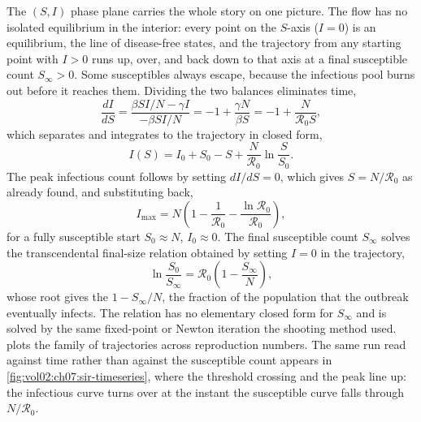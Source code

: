 The $(S, I)$ phase plane carries the whole story on one picture. The
flow has no isolated equilibrium in the interior: every point on the
$S$-axis ($I = 0$) is an equilibrium, the line of disease-free states,
and the trajectory from any starting point with $I > 0$ runs up, over,
and back down to that axis at a final susceptible count $S_{\infty} >
0$. Some susceptibles always escape, because the infectious pool burns
out before it reaches them. Dividing the two balances eliminates time,
\[
\frac{dI}{dS} = \frac{\beta S I/N - \gamma I}{-\beta S I/N}
= -1 + \frac{\gamma N}{\beta S} = -1 + \frac{N}{\mathcal{R}_{0} S},
\]
which separates and integrates to the trajectory in closed form,
\[
I(S) = I_{0} + S_{0} - S + \frac{N}{\mathcal{R}_{0}}
\ln\!\frac{S}{S_{0}}.
\]
The peak infectious count follows by setting $dI/dS = 0$, which gives
$S = N/\mathcal{R}_{0}$ as already found, and substituting back,
\[
I_{\max} = N\left(1 - \frac{1}{\mathcal{R}_{0}}
- \frac{\ln \mathcal{R}_{0}}{\mathcal{R}_{0}}\right),
\]
for a fully susceptible start $S_{0} \approx N$, $I_{0} \approx 0$.
The final susceptible count $S_{\infty}$ solves the transcendental
final-size relation obtained by setting $I = 0$ in the trajectory,
\[
\ln\!\frac{S_{0}}{S_{\infty}} = \mathcal{R}_{0}
\left(1 - \frac{S_{\infty}}{N}\right),
\]
whose root gives the  $1 - S_{\infty}/N$, the
fraction of the population that the outbreak eventually infects. The
relation has no elementary closed form for $S_{\infty}$ and is solved
by the same fixed-point or Newton iteration the shooting method used.
 plots the family of trajectories
across reproduction numbers. The same run read against time rather than
against the susceptible count appears in
\cref{fig:vol02:ch07:sir-timeseries}, where the threshold crossing and
the peak line up: the infectious curve turns over at the instant the
susceptible curve falls through $N/\mathcal{R}_{0}$.






